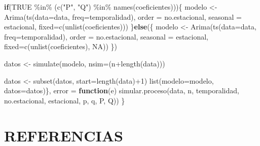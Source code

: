 \documentclass[
]{article}
\newenvironment{Shaded}{\begin{snugshade}}{\end{snugshade}}
\newcommand{\AttributeTok}[1]{\textcolor[rgb]{0.77,0.63,0.00}{#1}}
\newcommand{\ConstantTok}[1]{\textcolor[rgb]{0.00,0.00,0.00}{#1}}
\newcommand{\ControlFlowTok}[1]{\textcolor[rgb]{0.13,0.29,0.53}{\textbf{#1}}}
\newcommand{\DecValTok}[1]{\textcolor[rgb]{0.00,0.00,0.81}{#1}}
\newcommand{\FunctionTok}[1]{\textcolor[rgb]{0.00,0.00,0.00}{#1}}
\newcommand{\NormalTok}[1]{#1}
\newcommand{\OtherTok}[1]{\textcolor[rgb]{0.56,0.35,0.01}{#1}}
\newcommand{\SpecialCharTok}[1]{\textcolor[rgb]{0.00,0.00,0.00}{#1}}
\newcommand{\StringTok}[1]{\textcolor[rgb]{0.31,0.60,0.02}{#1}}
\begin{document}
\begin{Shaded}
\begin{Highlighting}[]
    \ControlFlowTok{if}\NormalTok{(}\ConstantTok{TRUE} \SpecialCharTok{\%in\%}\NormalTok{ (}\FunctionTok{c}\NormalTok{(}\StringTok{"P"}\NormalTok{, }\StringTok{"Q"}\NormalTok{) }\SpecialCharTok{\%in\%} \FunctionTok{names}\NormalTok{(coeficientes)))\{}
\NormalTok{        modelo }\OtherTok{\textless{}{-}} \FunctionTok{Arima}\NormalTok{(}\FunctionTok{ts}\NormalTok{(}\AttributeTok{data=}\NormalTok{data, }\AttributeTok{freq=}\NormalTok{temporalidad), }
                    \AttributeTok{order =}\NormalTok{ no.estacional, }
                    \AttributeTok{seasonal =}\NormalTok{ estacional,}
                    \AttributeTok{fixed=}\FunctionTok{c}\NormalTok{(}\FunctionTok{unlist}\NormalTok{(coeficientes)))}
\NormalTok{    \}}\ControlFlowTok{else}\NormalTok{(\{}
\NormalTok{        modelo }\OtherTok{\textless{}{-}} \FunctionTok{Arima}\NormalTok{(}\FunctionTok{ts}\NormalTok{(}\AttributeTok{data=}\NormalTok{data, }\AttributeTok{freq=}\NormalTok{temporalidad), }
                    \AttributeTok{order =}\NormalTok{ no.estacional, }
                    \AttributeTok{seasonal =}\NormalTok{ estacional,}
                    \AttributeTok{fixed=}\FunctionTok{c}\NormalTok{(}\FunctionTok{unlist}\NormalTok{(coeficientes), }\ConstantTok{NA}\NormalTok{))}
\NormalTok{    \})}
    
\NormalTok{    datos }\OtherTok{\textless{}{-}} \FunctionTok{simulate}\NormalTok{(modelo, }\AttributeTok{nsim=}\NormalTok{(n}\SpecialCharTok{+}\FunctionTok{length}\NormalTok{(data)))}
    
\NormalTok{    datos }\OtherTok{\textless{}{-}} \FunctionTok{subset}\NormalTok{(datos, }\AttributeTok{start=}\FunctionTok{length}\NormalTok{(data)}\SpecialCharTok{+}\DecValTok{1}\NormalTok{)}
    \FunctionTok{list}\NormalTok{(}\AttributeTok{modelo=}\NormalTok{modelo, }\AttributeTok{datos=}\NormalTok{datos)\}, }
    \AttributeTok{error =} \ControlFlowTok{function}\NormalTok{(e) }\FunctionTok{simular.proceso}\NormalTok{(data, n, temporalidad,}
\NormalTok{                                        no.estacional, estacional, }
\NormalTok{                                        p, q, P, Q))}
\NormalTok{\}}
\end{Highlighting}
\end{Shaded}

\newpage

\section{REFERENCIAS}
\end{document}
